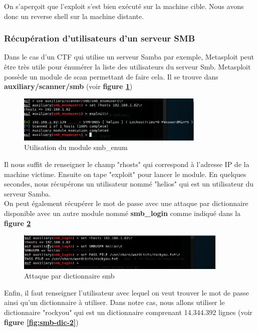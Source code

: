 On s'aperçoit que l'exploit s'est bien exécuté sur la machine cible. Nous avons donc un reverse shell sur la machine distante.

\subsubsection{Récupération d'utilisateurs d'un serveur SMB}
Dans le cas d'un CTF qui utilise un serveur Samba par exemple, Metasploit peut être très utile pour énumérer la liste des utilisateurs du serveur Smb. Metasploit possède un module de scan permettant de faire cela. Il se trouve dans \textbf{auxiliary/scanner/smb} (voir \textbf{figure \ref{fig:smb-enum}})\\

\begin{figure}[h]
  \centering
  \setlength\figureheight{7cm}
  \setlength\figurewidth{9cm}
  \includegraphics[width=0.8\textwidth]{oui/Ancien/imangeancien/msf_smb_enum.PNG}
  \caption{Utilisation du module smb\_enum}
  \label{fig:smb-enum}
\end{figure}

Il nous suffit de renseigner le champ "rhosts" qui correspond à l'adresse IP de la machine victime. Ensuite on tape "exploit" pour lancer le module. En quelques secondes, nous récupérons un utilisateur nommé "helios" qui est un utilisateur du serveur Samba.\\

On peut également récupérer le mot de passe avec une attaque par dictionnaire disponible avec un autre module nommé \textbf{smb\_login} comme indiqué dans la \textbf{figure \ref{fig:attaque-smb-dic}}

\begin{figure}[]
  \centering
  \setlength\figureheight{7cm}
  \setlength\figurewidth{9cm}
  \includegraphics[width=0.9\textwidth]{oui/Ancien/imangeancien/msf_smb_pass.PNG}
  \caption{Attaque par dictionnaire smb}
  \label{fig:attaque-smb-dic}
\end{figure}
Enfin, il faut renseigner l'utilisateur avec lequel on veut trouver le mot de passe ainsi qu'un dictionnaire à utiliser. Dans notre cas, nous allons utiliser le dictionnaire "rockyou" qui est un dictionnaire comprenant 14.344.392 lignes (voir \textbf{figure \ref{fig:smb-dic-2}})\\

